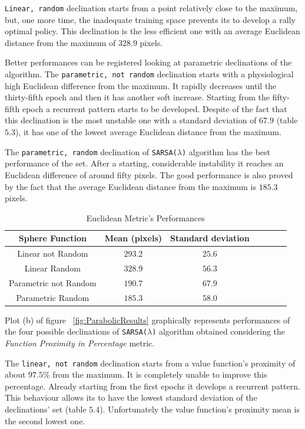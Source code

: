 {\tt Linear, random} declination starts from a point relatively close to the maximum, but, one more time, the inadequate training space prevents its to develop a rally optimal policy. This declination is the less efficient one with an average Euclidean distance from the maximum of $328.9$ pixels.

Better performances can be registered looking at parametric declinations of the algorithm. The {\tt parametric, not random} declination starts with a physiological high Euclidean difference from the maximum. It rapidly decreases until the thirty-fifth epoch and then it has another soft increase. Starting from the fifty-fifth epoch a recurrent pattern starts to be developed. Despite of the fact that this declination is the most unstable one with a standard deviation of $67.9$ (table $5.3$), it has one of the lowest average Euclidean distance from the maximum. 

The {\tt parametric, random} declination of {\tt SARSA($\lambda$)} algorithm has the best performance of the set. After a starting, considerable instability it reaches an Euclidean difference of around fifty pixels. The good performance is also proved by the fact that the average Euclidean distance from the maximum is $185.3$ pixels. \\

\begin{table}[h!]
	\centering
	\resizebox{\linewidth}{!} {
	\begin{tabular}{c| cccccc} 
		\hline \textbf{Sphere Function}
		& \textbf{Mean (pixels)} & \textbf{Standard deviation} \\ 
		\hline Linear not Random
		& $293.2$ &\cellcolor{red!25} $25.6$  \\ 
		\hline Linear Random
		& $328.9$ & $56.3$ \\ 
		\hline Parametric not Random
		& $190.7$ & $67.9$ \\ 
		\hline Parametric Random
		& \cellcolor{red!25} $185.3$ & $58.0$ \\ 
		\hline 
	\end{tabular} 
}
\label{ParabolicTabEuclidean}
\caption{Euclidean Metric's Performances}
\end{table}

Plot (b) of figure ~\ref{fig:ParabolicResults} graphically represents performances of the four possible declinations of {\tt SARSA($\lambda$)} algorithm obtained considering the \textit{Function Proximity in Percentage} metric. 

The {\tt linear, not random} declination starts from a value function's proximity of about $97.5\%$ from the maximum. It is completely unable to improve this percentage. Already starting from the first epochs it develops a recurrent pattern. This behaviour allows its to have the lowest standard deviation of the declinations' set (table $5.4$). Unfortunately the value function's proximity mean is the second lowest one. 
 
